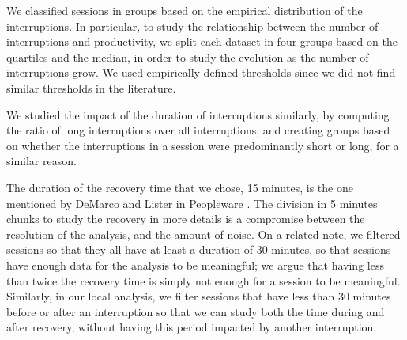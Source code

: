 \documentclass[times]{smrauth}
\begin{document}
We classified sessions in groups based on the empirical distribution of the interruptions. In particular, to study the relationship between the number of interruptions and productivity, we split each dataset in four groups based on the quartiles and the median, in order to study the evolution as the number of interruptions grow. We used empirically-defined thresholds since we did not find similar thresholds in the literature. %

We studied the impact of the duration of interruptions similarly, by computing the ratio of long interruptions over all interruptions, and creating groups based on whether the interruptions in a session were predominantly short or long, for a similar reason.

The duration of the recovery time that we chose, 15 minutes, is the one mentioned by DeMarco and Lister in Peopleware \cite{demarco1999peopleware}. The division in 5 minutes chunks to study the recovery in more details is a compromise between the resolution of the analysis, and the amount of noise. On a related note, we filtered sessions so that they all have at least a duration of 30 minutes, so that sessions have enough data for the analysis to be meaningful; we argue that having less than twice the recovery time is simply not enough for a session to be meaningful. Similarly, in our local analysis, we filter sessions that have less than 30 minutes before or after an interruption so that we can study both the time during and after recovery, without having this period impacted by another interruption.










\end{document}
